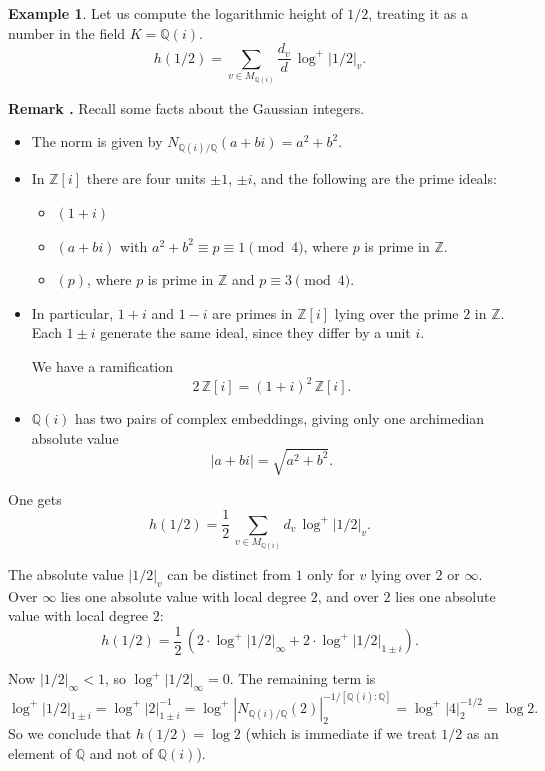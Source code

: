 \documentclass{article}
\theoremstyle{definition}
\newtheorem{example}[proposition]{Example}
\newcommand{\ZZ}{\mathbb{Z}}
\newcommand{\QQ}{\mathbb{Q}}
\newenvironment{remark}
{ \begin{shaded}\begingroup\small\noindent\refstepcounter{proposition}\textbf{Remark \theproposition.} }
{ \endgroup\end{shaded} }
\begin{document}
\begin{example}
  Let us compute the logarithmic height of $1/2$, treating it as a number in the
  field $K = \QQ (i)$.
  \[ h (1/2) = \sum_{v \in M_{\QQ (i)}} \frac{d_v}{d} \, \log^+ |1/2|_v. \]

  \begin{remark}
    Recall some facts about the Gaussian integers.
    \begin{itemize}
    \item The norm is given by $N_{\QQ (i) / \QQ} (a + bi) = a^2 + b^2$.

    \item In $\ZZ [i]$ there are four units $\pm 1$, $\pm i$, and the following
      are the prime ideals:
      \begin{itemize}
      \item $(1 + i)$

      \item $(a + bi)$ with $a^2 + b^2 \equiv p \equiv 1 \pmod{4}$, where $p$ is
        prime in $\ZZ$.

      \item $(p)$, where $p$ is prime in $\ZZ$ and $p \equiv 3 \pmod{4}$.
      \end{itemize}

    \item In particular, $1+i$ and $1-i$ are primes in $\ZZ [i]$ lying over the
      prime $2$ in $\ZZ$. Each $1 \pm i$ generate the same ideal, since they
      differ by a unit $i$.

      We have a ramification
      \[ 2\,\ZZ[i] = (1 + i)^2\,\ZZ[i]. \]

    \item $\QQ (i)$ has two pairs of complex embeddings, giving only one
      archimedian absolute value
      \[ |a + bi| = \sqrt{a^2 + b^2}. \]
    \end{itemize}
  \end{remark}

  One gets
  \[ h (1/2) = \frac{1}{2} \, \sum_{v \in M_{\QQ (i)}} d_v \, \log^+ |1/2|_v. \]

  The absolute value $|1/2|_v$ can be distinct from $1$ only for $v$ lying over
  $2$ or $\infty$. Over $\infty$ lies one absolute value with local degree $2$,
  and over $2$ lies one absolute value with local degree $2$:
  \[ h (1/2) = \frac{1}{2} \, (2 \cdot \log^+ |1/2|_\infty + 2\cdot \log^+ |1/2|_{1\pm i}). \]

  Now $|1/2|_\infty < 1$, so $\log^+ |1/2|_\infty = 0$. The remaining term is
  \[ \log^+ |1/2|_{1\pm i} = \log^+ |2|^{-1}_{1\pm i} =
    \log^+ |N_{\QQ(i)/\QQ} (2)|_2^{-1/[\QQ (i) : \QQ]} =
    \log^+ |4|^{-1/2}_2 = \log 2. \]
  So we conclude that $h (1/2) = \log 2$ (which is immediate if we treat $1/2$
  as an element of $\QQ$ and not of $\QQ (i)$).
\end{example}
\end{document}
